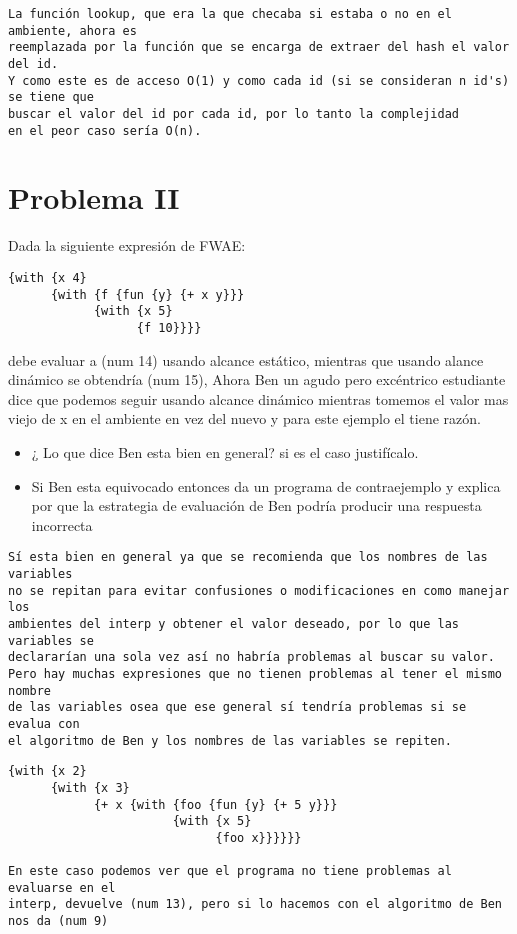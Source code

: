 \documentclass[a4paper]{article}
\begin{document}
\begin{itemize}
\begin{verbatim}
La función lookup, que era la que checaba si estaba o no en el ambiente, ahora es 
reemplazada por la función que se encarga de extraer del hash el valor del id. 
Y como este es de acceso O(1) y como cada id (si se consideran n id's) se tiene que 
buscar el valor del id por cada id, por lo tanto la complejidad
en el peor caso sería O(n).
\end{verbatim}

\end{itemize}


\section{Problema II}
Dada la siguiente expresión de FWAE: 

\begin{verbatim}
{with {x 4} 
      {with {f {fun {y} {+ x y}}} 
            {with {x 5}
                  {f 10}}}}
\end{verbatim}

debe evaluar a (num 14) usando alcance estático, mientras que usando alance dinámico se obtendría (num 15),
Ahora Ben un agudo pero excéntrico estudiante dice que podemos seguir usando alcance dinámico mientras tomemos
el valor mas viejo de x en el ambiente en vez del nuevo y para este ejemplo el tiene razón.

\begin{itemize}
\item ¿ Lo que dice Ben esta bien en general? si es el caso justifícalo.
\item Si Ben esta equivocado entonces da un programa de contraejemplo y explica por que la estrategia de evaluación de Ben podría producir una respuesta incorrecta
\end{itemize}

\begin{verbatim}
Sí esta bien en general ya que se recomienda que los nombres de las variables 
no se repitan para evitar confusiones o modificaciones en como manejar los 
ambientes del interp y obtener el valor deseado, por lo que las variables se 
declararían una sola vez así no habría problemas al buscar su valor.
Pero hay muchas expresiones que no tienen problemas al tener el mismo nombre
de las variables osea que ese general sí tendría problemas si se evalua con 
el algoritmo de Ben y los nombres de las variables se repiten.
\end{verbatim}


\begin{verbatim}
{with {x 2} 
      {with {x 3} 
            {+ x {with {foo {fun {y} {+ 5 y}}}
                       {with {x 5} 
                             {foo x}}}}}}
                             
En este caso podemos ver que el programa no tiene problemas al evaluarse en el 
interp, devuelve (num 13), pero si lo hacemos con el algoritmo de Ben nos da (num 9)
\end{verbatim}
\end{document}
